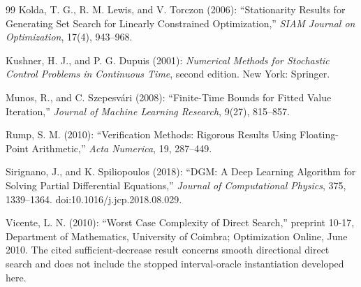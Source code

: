 \begin{thebibliography}{99}
Kolda, T. G., R. M. Lewis, and V. Torczon (2006): ``Stationarity Results for Generating Set Search for Linearly Constrained Optimization,'' \emph{SIAM Journal on Optimization}, 17(4), 943--968.

Kushner, H. J., and P. G. Dupuis (2001): \emph{Numerical Methods for Stochastic Control Problems in Continuous Time}, second edition. New York: Springer.

Munos, R., and C. Szepesv\'ari (2008): ``Finite-Time Bounds for Fitted Value Iteration,'' \emph{Journal of Machine Learning Research}, 9(27), 815--857.

Rump, S. M. (2010): ``Verification Methods: Rigorous Results Using Floating-Point Arithmetic,'' \emph{Acta Numerica}, 19, 287--449.

Sirignano, J., and K. Spiliopoulos (2018): ``DGM: A Deep Learning Algorithm for Solving Partial Differential Equations,'' \emph{Journal of Computational Physics}, 375, 1339--1364. doi:10.1016/j.jcp.2018.08.029.

Vicente, L. N. (2010): ``Worst Case Complexity of Direct Search,'' preprint 10-17, Department of Mathematics, University of Coimbra; Optimization Online, June 2010. The cited sufficient-decrease result concerns smooth directional direct search and does not include the stopped interval-oracle instantiation developed here.

\end{thebibliography}
